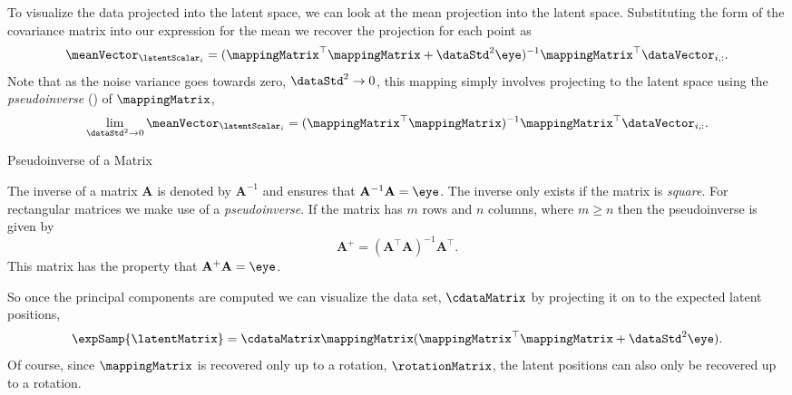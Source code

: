 To visualize the data projected into the latent space, we can look at
the mean projection into the latent space. Substituting the form of
the covariance matrix into our expression for the mean we recover the
projection for each point as
\[
\meanVector_{\latentScalar_i} =
(\mappingMatrix^\top\mappingMatrix+\dataStd^{2}\eye)^{-1}
\mappingMatrix^\top\dataVector_{i,:}.
\]
Note that as the noise variance goes towards zero,
$\dataStd^2\rightarrow 0$, this mapping simply involves projecting to
the latent space using the \emph{\gls{pseudoinverse}}
() of $\mappingMatrix$,
\[
\lim_{\dataStd^2\rightarrow 0} \meanVector_{\latentScalar_i} =
(\mappingMatrix^\top\mappingMatrix)^{-1}\mappingMatrix^\top\dataVector_{i,:}.
\]
\begin{boxfloat}
  \caption{Pseudoinverse of a Matrix}\label{box:pseudoinverse}
  \boxfontsize The inverse of a matrix $\mathbf{A}$ is denoted by
  $\mathbf{A}^{-1}$ and ensures that
  $\mathbf{A}^{-1}\mathbf{A}=\eye$. The inverse only exists if the
  matrix is \emph{square}. For rectangular matrices we make use of a
  \emph{pseudoinverse}. If the matrix has $m$ rows and $n$ columns,
  where $m \geq n$ then the pseudoinverse is given by
  \[
  \mathbf{A}^{+}=(\mathbf{A}^\top\mathbf{A})^{-1}\mathbf{A}^\top.
  \] 
  This matrix has the property that $\mathbf{A}^{+}\mathbf{A} = \eye$.
\end{boxfloat}

So once the principal components are computed we can visualize the data set, $\cdataMatrix$ by projecting it on to the expected latent positions,
\[
\expSamp{\latentMatrix} = \cdataMatrix\mappingMatrix(\mappingMatrix^\top\mappingMatrix + \dataStd^2 \eye).
\]
Of course, since $\mappingMatrix$ is recovered only up to a rotation,
$\rotationMatrix$, the latent positions can also only be recovered up
to a rotation.

